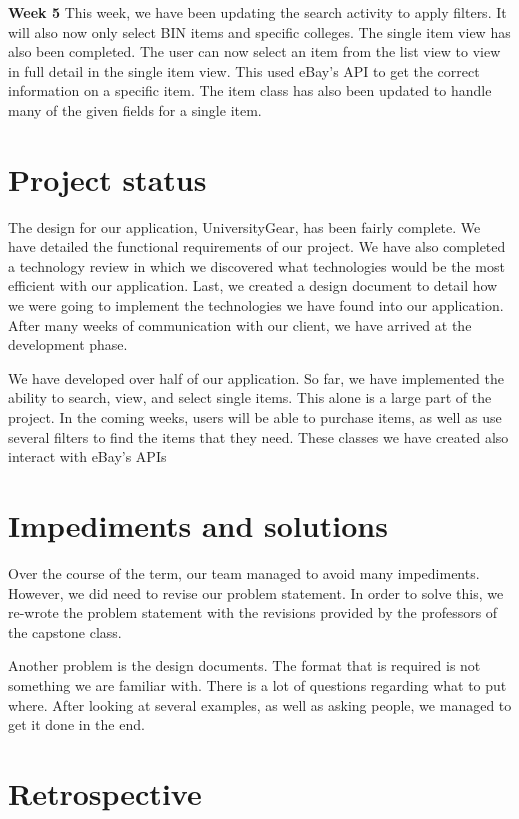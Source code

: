 \documentclass[journal,compsoc, 10pt, draftclsnofoot, onecolumn]{IEEEtran}
\begin{document}
\textbf{Week 5}\newline
This week, we have been updating the search activity to apply filters. It will 
also now only select BIN items and specific colleges. The single item view has 
also been completed. The user can now select an item from the list view to view 
in full detail in the single item view. This used eBay's API to get the correct 
information on a specific item. The item class has also been updated to handle 
many of the given fields for a single item. 


\section{Project status}
The design for our application, UniversityGear, has been fairly complete. We 
have detailed the functional requirements of our project. We have also completed 
a technology review in which we discovered what technologies would be the most 
efficient with our application. Last, we created a design document to detail how 
we were going to implement the technologies we have found into our application.
After many weeks of communication with our client, we have arrived at the 
development phase.\newline

We have developed over half of our application. So far, we have implemented the 
ability to search, view, and select single items. This alone is a large part of 
the project. In the coming weeks, users will be able to purchase items, as well 
as use several filters to find the items that they need. These classes we have 
created also interact with eBay's APIs

\section{Impediments and solutions}
Over the course of the term, our team managed to avoid many impediments. However, 
we did need to revise our problem statement. In order to solve this, we re-wrote the 
problem statement with the revisions provided by the professors of the capstone 
class. 

Another problem is the design documents. The format that is required is not something we are familiar with. There is a lot of questions regarding what to put where. After looking at several examples, as well as asking people, we managed to get it done in the end.

\section{Retrospective}
\end{document}
